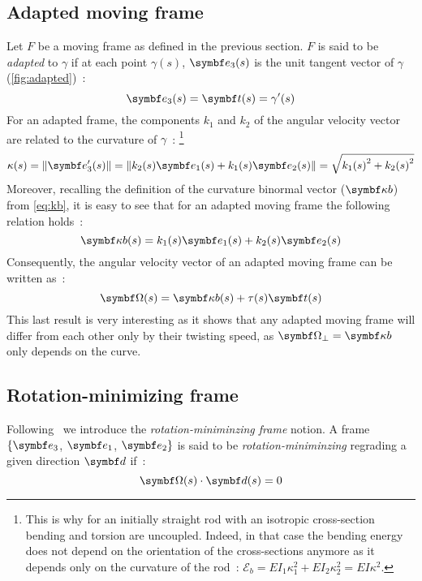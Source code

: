 \subsection{Adapted moving frame}\label{sec=amf}

Let $F$ be a moving frame as defined in the previous section. $F$ is said to be \emph{adapted} to $\gamma$ if at each point $\gamma(s)$, $\vect{e}_{3}(s)$ is the unit tangent vector of $\gamma$ (\cref{fig:adapted})~:
\begin{equation}
	\vect{e}_{3}(s) = \vect{t}(s) = \gamma'(s)
\end{equation}
For an adapted frame, the components $k_1$ and $k_2$ of the angular velocity vector are related to the curvature of $\gamma$~: \footnote{This is why for an initially straight rod with an isotropic cross-section bending and torsion are uncoupled. Indeed, in that case the bending energy does not depend on the orientation of the cross-sections anymore as it depends only on the curvature of the rod~: $\mathcal{E}_b = EI_1\kappa_1^2 + EI_2\kappa_2^2 = EI\kappa^2$.}
\begin{equation}
	\kappa(s) = \norm{\vect{e}'_{3}(s)} = \norm{k_2(s)\vect{e}_1(s) + k_1(s)\vect{e}_2(s)} = \sqrt{{k_{1}(s)}^2 + {k_{2}(s)}^2}
	\label{eq:kb_components}
\end{equation}
Moreover, recalling the definition of the curvature binormal vector ($\vect{\kappa b}$) from \cref{eq:kb}, it is easy to see that for an adapted moving frame the following relation holds~:
 \begin{equation}
	\vect{\kappa b}(s) = k_1(s) \vect{e}_1(s) +  k_2(s) \vect{e}_2(s) \label{eq:amf_kb}
\end{equation}
Consequently, the angular velocity vector of an adapted moving frame can be written as~:
 \begin{equation}
	\vect{\Omega}(s) = \vect{\kappa b}(s)  + \tau(s) \vect{t}(s)
	\label{eq:angular_velocity}
\end{equation}
This last result is very interesting as it shows that any adapted moving frame will differ from each other only by their twisting speed, as $\vect{\Omega}_{\perp} =  \vect{\kappa b}$ only depends on the curve.

\subsection{Rotation-minimizing frame}
Following~\cite{Farouki2014, Wang2008} we introduce the \emph{rotation-miniminzing frame} notion. A frame $\{\vect{e}_{3}$, $\vect{e}_{1}$, $\vect{e}_{2}\}$ is said to be \emph{rotation-miniminzing} regrading a given direction $\vect{d}$ if~:
\begin{equation}
	\vect{\Omega}(s) \cdot \vect{d}(s) = 0
\end{equation}

